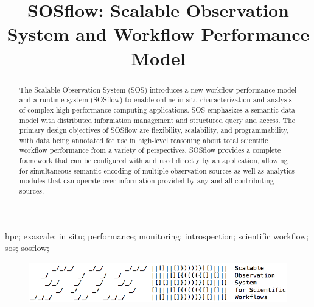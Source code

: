 
\title{SOSflow: Scalable Observation System and Workflow Performance Model}

\author{
\IEEEauthorblockA{Department of Computer and Information Science\\
                  University of Oregon\\ Eugene, OR United States\\
                  Email: cdw@cs.uoregon.edu} }
\maketitle


\begin{abstract}
The Scalable Observation System (SOS) introduces a new workflow
performance model and a runtime system (SOSflow) to enable online in
situ characterization and analysis of complex high-performance
computing applications. SOS emphasizes a semantic data model with
distributed information management and structured query and
access. The primary design objectives of SOSflow are flexibility,
scalability, and programmability, with data being annotated for use in
high-level reasoning about total scientific workflow performance from
a variety of perspectives. SOSflow provides a complete framework that
can be configured with and used directly by an application, allowing
for simultaneous semantic encoding of multiple observation sources as
well as analytics modules that can operate over information provided
by any and all contributing sources.
\end{abstract}


\begin{IEEEkeywords}
hpc; exascale; in situ; performance; monitoring; introspection;
scientific workflow; sos; sosflow;
\end{IEEEkeywords}


\IEEEpeerreviewmaketitle


\begin{figure}[!t]
\centering
\includegraphics[width=5in]{images/sosflow_masthead.png}
\label{fig_sim}
\end{figure}




